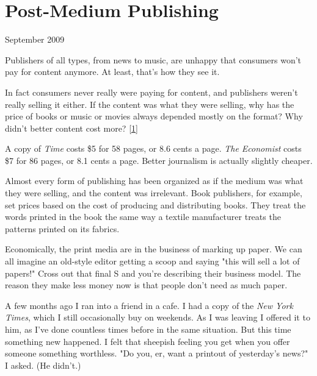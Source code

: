 \chapter{Post-Medium Publishing}


            
              
                

September 2009

Publishers of all types, from news
                  to music, are unhappy that consumers won't pay for content
                  anymore. At least, that's how they see it.

In fact
                  consumers never really were paying for content, and publishers
                  weren't really selling it either. If the content was what they
                  were selling, why has the price of books or music or movies
                  always depended mostly on the format? Why didn't better
                  content cost more?
                  [\href{\#f1n}{1}]

A copy of \emph{Time} costs \$5 for 58 pages, or
                  8.6 cents a page. \emph{The Economist} costs \$7 for 86 pages,
                  or 8.1 cents a page. Better journalism is actually slightly
                  cheaper.

Almost every form of publishing has been
                  organized as if the medium was what they were selling, and the
                  content was irrelevant. Book publishers, for example, set
                  prices based on the cost of producing and distributing books.
                  They treat the words printed in the book the same way a
                  textile manufacturer treats the patterns printed on its
                  fabrics.

Economically, the print media are in the
                  business of marking up paper. We can all imagine an old-style
                  editor getting a scoop and saying "this will sell a lot of
                  papers!" Cross out that final S and you're describing their
                  business model. The reason they make less money now is that
                  people don't need as much paper.

A few months ago I
                  ran into a friend in a cafe. I had a copy of the
                  \emph{New York Times}, which I still occasionally buy on
                  weekends. As I was leaving I offered it to him, as I've done
                  countless times before in the same situation. But this time
                  something new happened. I felt that sheepish feeling you get
                  when you offer someone something worthless. "Do you, er, want
                  a printout of yesterday's news?" I asked. (He didn't.)

